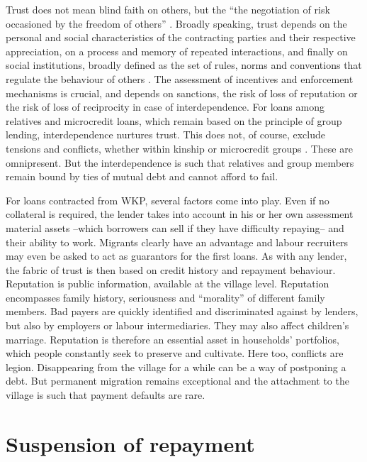 \documentclass[a4paper, 11pt, onecolumn]{article}
\begin{document}
Trust does not mean blind faith on others, but the ``the negotiation of risk occasioned by the freedom of others'' \citep[p.188]{Hart2000}. 
Broadly speaking, trust depends on the personal and social characteristics of the contracting parties and their respective appreciation, on a process and memory of repeated interactions, and finally on social institutions, broadly defined as the set of rules, norms and conventions that regulate the behaviour of others \citep{Platteau1994}. 
The assessment of incentives and enforcement mechanisms is crucial, and depends on sanctions, the risk of loss of reputation or the risk of loss of reciprocity in case of interdependence. 
For loans among relatives and microcredit loans, which remain based on the principle of group lending, interdependence nurtures trust. 
This does not, of course, exclude tensions and conflicts, whether within kinship or microcredit groups \citep{Kar2018}. 
These are omnipresent. 
But the interdependence is such that relatives and group members remain bound by ties of mutual debt and cannot afford to fail. 

For loans contracted from WKP, several factors come into play.
Even if no collateral is required, the lender takes into account in his or her own assessment material assets --which borrowers can sell if they have difficulty repaying-- and their ability to work. 
Migrants clearly have an advantage and labour recruiters may even be asked to act as guarantors for the first loans. 
As with any lender, the fabric of trust is then based on credit history and repayment behaviour. 
Reputation is public information, available at the village level. 
Reputation encompasses family history, seriousness and ``morality'' of different family members. 
Bad payers are quickly identified and discriminated against by lenders, but also by employers or labour intermediaries. 
They may also affect children’s marriage. 
Reputation is therefore an essential asset in households’ portfolios, which people constantly seek to preserve and cultivate. 
Here too, conflicts are legion. 
Disappearing from the village for a while can be a way of postponing a debt. 
But permanent migration remains exceptional and the attachment to the village is such that payment defaults are rare.

\section{Suspension of repayment}
\label{section:repayment}
\end{document}
